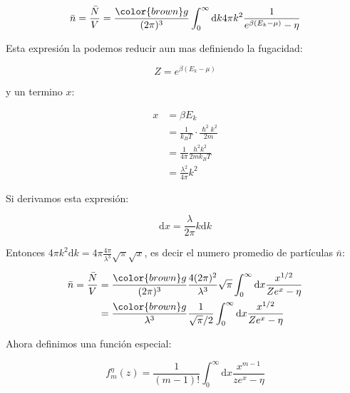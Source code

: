 \documentclass[11pt,fleqn]{book}
\begin{document}
\begin{equation*}
     \bar{n}=\frac{\bar{N}}{V}=\frac{{\color{brown}g}}{(2\pi)^{3}}\int_{0}^{{\infty}}\mathrm{d}k4\pi k^{2}\frac{1}{e^{\beta(E_{k}-\mu)}-\eta}
\end{equation*}

Esta expresión la podemos reducir aun mas definiendo la fugacidad: 

\begin{equation*}
    Z=e^{\beta(E_{k}-\mu)}
\end{equation*}

y un termino $x$:

\begin{equation}
    \begin{split}
        x&=\beta E_{k}\\
        &=\frac{1}{k_{B}T}\cdot\frac{\hslash^{2}k^{2}}{2m}\\
        &=\frac{1}{4\pi}\frac{h^{2}k^{2}}{2mk_{B}T}\\
        &=\frac{\lambda^{2}}{4\pi}k^{2}
    \end{split}
\end{equation}

Si derivamos esta expresión:

\begin{equation*}
    \mathrm{d}x=\frac{\lambda}{2\pi}k\mathrm{d}k
\end{equation*}

Entonces $4\pi k^{2}\mathrm{d}k=4\pi\frac{4\pi}{\lambda^{3}}\sqrt{\pi}\sqrt{x}$, es decir el numero promedio de partículas $\bar{n}$:

\begin{equation*}
    \begin{split}
       \bar{n}=\frac{\bar{N}}{V}&=\frac{{\color{brown}g}}{(2\pi)^{3}}\frac{4(2\pi)^{2}}{\lambda^{3}}\sqrt{\pi}\int_{0}^{{\infty}}\mathrm{d}x\frac{x^{1/2}}{Ze^{x}-\eta}\\
       &=\frac{{\color{brown}g}}{\lambda^{3}}\frac{1}{\sqrt{\pi}/2}\int_{0}^{{\infty}}\mathrm{d}x\frac{x^{1/2}}{Ze^{x}-\eta}
    \end{split}
\end{equation*}

Ahora definimos una función especial:

\begin{equation}
    f_{m}^{\eta}(z)=\frac{1}{(m-1)!}\int_{0}^{{\infty}}\mathrm{d}x\frac{x^{m-1}}{ze^{x}-\eta}
    \label{Eq. 5.56}
\end{equation}
\end{document}
